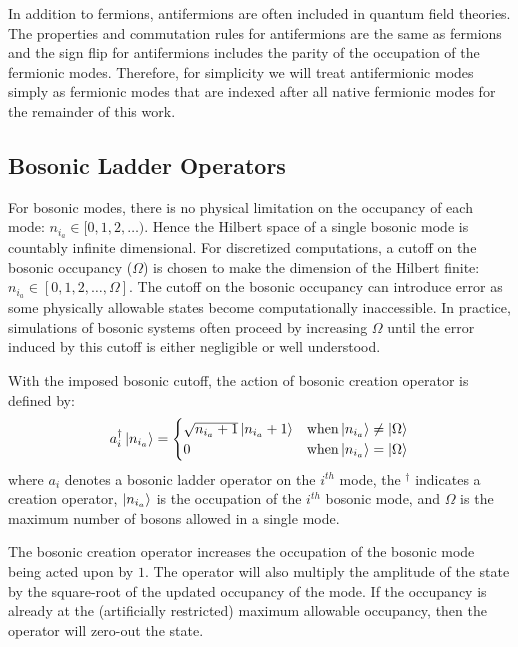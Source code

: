 In addition to fermions, antifermions are often included in quantum field theories.
The properties and commutation rules for antifermions are the same as fermions and the sign flip for antifermions includes the parity of the occupation of the fermionic modes.
Therefore, for simplicity we will treat antifermionic modes simply as fermionic modes that are indexed after all native fermionic modes for the remainder of this work.

\subsection{Bosonic Ladder Operators}
\label{subsec:bosonic-ladder}

For bosonic modes, there is no physical limitation on the occupancy of each mode: $n_{i_a} \in [0, 1, 2, \dots)$.
Hence the Hilbert space of a single bosonic mode is countably infinite dimensional. 
For discretized computations, a cutoff on the bosonic occupancy ($\Omega$) is chosen to make the dimension of the Hilbert finite: $n_{i_a} \in [0, 1, 2, \dots, \Omega]$.
The cutoff on the bosonic occupancy can introduce error as some physically allowable states become computationally inaccessible.
In practice, simulations of bosonic systems often proceed by increasing $\Omega$ until the error induced by this cutoff is either negligible or well understood.

With the imposed bosonic cutoff, the action of bosonic creation operator is defined by:
\begin{equation}
    \label{eq:bosonic-creation}
    a_i^\dagger \ket{n_{i_a}} = 
    \begin{cases} 
        \sqrt{n_{i_a} + 1} \ket{n_{i_a} + 1}  & {\rm when} \ket{n_{i_a}} \neq \ket{\Omega} \\
        0 & {\rm when} \ket{n_{i_a}} = \ket{\Omega}
    \end{cases}
\end{equation}
where $a_i$ denotes a bosonic ladder operator on the $i^{th}$ mode, the $^\dagger$ indicates a creation operator, $\ket{n_{i_a}}$ is the occupation of the $i^{th}$ bosonic mode, and $\Omega$ is the maximum number of bosons allowed in a single mode.

The bosonic creation operator increases the occupation of the bosonic mode being acted upon by $1$.
The operator will also multiply the amplitude of the state by the square-root of the updated occupancy of the mode.
If the occupancy is already at the (artificially restricted) maximum allowable occupancy, then the operator will zero-out the state.

